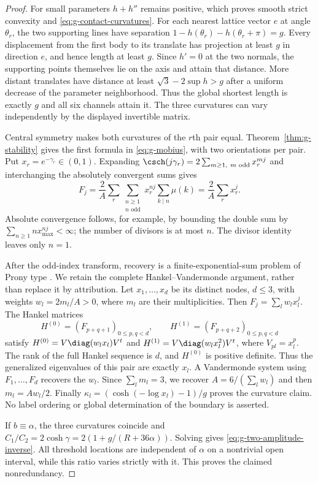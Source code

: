 \begin{proof}
For small parameters $h+h''$ remains positive, which proves smooth
strict convexity and \eqref{eq:g-contact-curvatures}. For each nearest
lattice vector $e$ at angle $\theta_r$, the two supporting lines have
separation $1-h(\theta_r)-h(\theta_r+\pi)=g$.
Every displacement from the first body to its translate has projection
at least $g$ in direction $e$, and hence length at least $g$.
Since $h'=0$ at the two normals, the supporting points themselves lie
on the axis and attain that distance. More distant translates have
distance at least $\sqrt3-2\sup h>g$ after a uniform decrease of the
parameter neighborhood. Thus the global shortest length is exactly
$g$ and all six channels attain it. The three curvatures can vary
independently by the displayed invertible matrix.

Central symmetry makes both curvatures of the $r$th pair equal.
Theorem~\ref{thm:g-stability} gives the first formula in
\eqref{eq:g-mobius}, with two orientations per pair. Put
$x_r=e^{-\gamma_r}\in(0,1)$. Expanding
$\csch(j\gamma_r)=2\sum_{m\ge1,\ m\text{ odd}}x_r^{mj}$
and interchanging the absolutely convergent sums gives
\[
 F_j=\frac2A\sum_r\sum_{\substack{n\ge1\\n\text{ odd}}}
        x_r^{nj}\sum_{k\mid n}\mu(k)=\frac2A\sum_r x_r^j.
\]
Absolute convergence follows, for example, by bounding the double sum
by $\sum_{n\ge1}n x_{\max}^{nj}<\infty$; the number of divisors
is at most $n$. The divisor identity leaves only $n=1$.

After the odd-index transform, recovery is a finite-exponential-sum
problem of Prony type \cite{BYProny}. We retain the complete
Hankel--Vandermonde argument, rather than replace it by attribution. Let $x_1,\ldots,x_d$
be its distinct nodes, $d\le3$, with weights $w_l=2m_l/A>0$, where
$m_l$ are their multiplicities. Then $F_j=\sum_l w_lx_l^j$.
The Hankel matrices
\[
 H^{(0)}=(F_{p+q+1})_{0\le p,q<d},\qquad
 H^{(1)}=(F_{p+q+2})_{0\le p,q<d}
\]
satisfy $H^{(0)}=V\diag(w_lx_l)V^t$ and
$H^{(1)}=V\diag(w_lx_l^2)V^t$, where $V_{pl}=x_l^p$.
The rank of the full Hankel sequence is $d$, and $H^{(0)}$ is positive
definite. Thus the generalized eigenvalues of this pair are exactly
$x_l$. A Vandermonde system using $F_1,\ldots,F_d$ recovers the $w_l$.
Since $\sum_lm_l=3$, we recover
$A=6/(\sum_lw_l)$ and then $m_l=Aw_l/2$.
Finally $\kappa_l=(\cosh(-\log x_l)-1)/g$ proves the curvature claim.
No label ordering or global determination of the boundary is asserted.

If $b\equiv\alpha$, the three curvatures coincide and
$C_1/C_2=2\cosh\gamma=2(1+g/(R+36\alpha))$.
Solving gives \eqref{eq:g-two-amplitude-inverse}. All threshold locations
are independent of $\alpha$ on a nontrivial open interval, while this
ratio varies strictly with it. This proves the claimed nonredundancy.
\end{proof}

